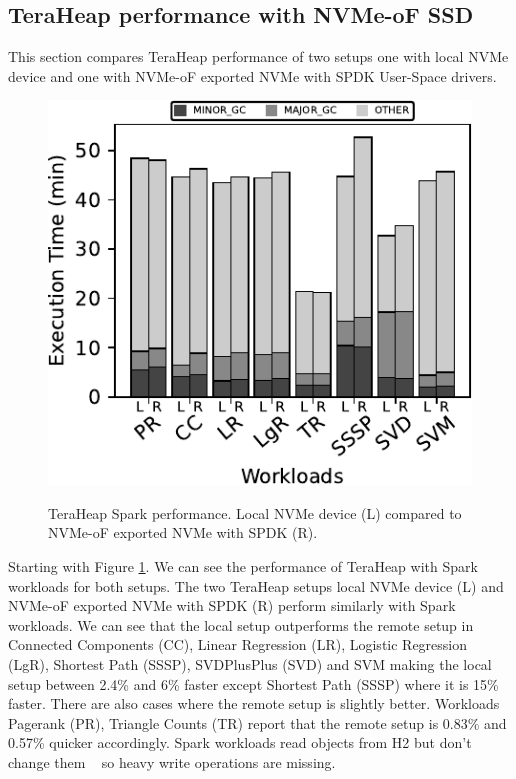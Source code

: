 \subsection{TeraHeap performance with NVMe-oF SSD}
\par This section compares TeraHeap performance of two setups one with local NVMe device and one with NVMe-oF exported NVMe with SPDK User-Space drivers.
\begin{figure}[H]
  \includegraphics[width=\linewidth]{figures/bench_spark.pdf}\\
\caption{TeraHeap Spark performance. Local NVMe device (L) compared to NVMe-oF exported NVMe with SPDK (R).}
\label{fig:bench_spark}
\end{figure}
Starting with Figure \ref{fig:bench_spark}. We can see the performance of TeraHeap with Spark workloads for both setups.
The two TeraHeap setups local NVMe device (L) and NVMe-oF exported NVMe with
SPDK (R) perform similarly with Spark workloads. We can see that the local setup
outperforms the remote setup in Connected Components (CC), Linear Regression (LR), Logistic Regression (LgR), Shortest Path (SSSP), SVDPlusPlus (SVD) and SVM making the local setup between 2.4\% and 6\% faster except Shortest Path (SSSP) where it is 15\% faster. There are also cases where the remote setup is slightly better. Workloads Pagerank (PR), Triangle Counts (TR) report that the remote
setup is 0.83\% and 0.57\% quicker accordingly. Spark workloads
read objects from H2 but don't change them  ~\cite{spark,teraheap} so heavy
write operations are missing.

